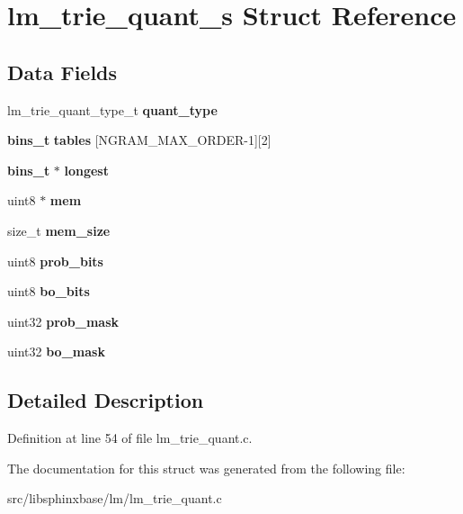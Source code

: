 \section{lm\-\_\-trie\-\_\-quant\-\_\-s Struct Reference}
\label{structlm__trie__quant__s}
\subsection*{Data Fields}
\begin{DoxyCompactItemize}
\item 
lm\-\_\-trie\-\_\-quant\-\_\-type\-\_\-t {\bfseries quant\-\_\-type}\label{structlm__trie__quant__s_a45b2e48c780354c98a7437c3d2eaf341}

\item 
{\bf bins\-\_\-t} {\bfseries tables} [N\-G\-R\-A\-M\-\_\-\-M\-A\-X\-\_\-\-O\-R\-D\-E\-R-\/1][2]\label{structlm__trie__quant__s_a73fa4af73d4a3767d221921f71a95940}

\item 
{\bf bins\-\_\-t} $\ast$ {\bfseries longest}\label{structlm__trie__quant__s_a218f78c52d512605133668b765e3260b}

\item 
uint8 $\ast$ {\bfseries mem}\label{structlm__trie__quant__s_add104d4880f471d73fd886b2eae7ca66}

\item 
size\-\_\-t {\bfseries mem\-\_\-size}\label{structlm__trie__quant__s_a348c9280b8fccbac99890a5bf3a69d94}

\item 
uint8 {\bfseries prob\-\_\-bits}\label{structlm__trie__quant__s_a3696f006dc23c7faddd81419aae4de64}

\item 
uint8 {\bfseries bo\-\_\-bits}\label{structlm__trie__quant__s_a7d8ec82f7dde68d7a7e4ea495972bddc}

\item 
uint32 {\bfseries prob\-\_\-mask}\label{structlm__trie__quant__s_ad70aed4374709125a85a915815538a61}

\item 
uint32 {\bfseries bo\-\_\-mask}\label{structlm__trie__quant__s_a2b8c82b5f452346651055c0cd7a3b3f2}

\end{DoxyCompactItemize}


\subsection{Detailed Description}


Definition at line 54 of file lm\-\_\-trie\-\_\-quant.\-c.



The documentation for this struct was generated from the following file\-:\begin{DoxyCompactItemize}
\item 
src/libsphinxbase/lm/lm\-\_\-trie\-\_\-quant.\-c\end{DoxyCompactItemize}
